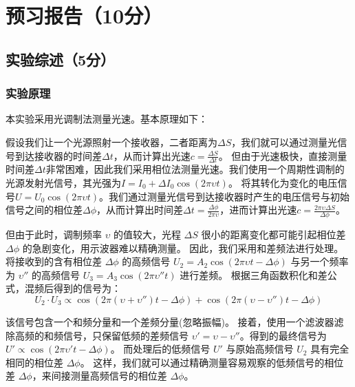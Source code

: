 \documentclass[]{../../templates/Report}%
\begin{document}
\maketitle

\section{预习报告（10分）}
\subsection{实验综述（5分）}
\subsubsection{实验原理}
本实验采用光调制法测量光速。基本原理如下：

假设我们让一个光源照射一个接收器，二者距离为$\Delta S$，我们就可以通过测量光信号到达接收器的时间差$\Delta t$，从而计算出光速$c=\frac{\Delta S}{\Delta t}$。
但由于光速极快，直接测量时间差$\Delta t$非常困难，因此我们采用相位法测量光速。我们使用一个周期性调制的光源发射光信号，其光强为$I=I_0 +\Delta I_0 \cos(2\pi \upsilon t)$。
将其转化为变化的电压信号$U=U_0 \cos(2\pi \upsilon t)$。我们通过测量光信号到达接收器时产生的电压信号与初始信号之间的相位差$\Delta \phi$，从而计算出时间差$\Delta t=\frac{\Delta \phi}{2\pi \upsilon }$，进而计算出光速$c=\frac{2\pi \upsilon  \Delta S}{\Delta \phi}$。

但由于此时，调制频率 $\upsilon $ 的值较大，光程 $\Delta S$ 很小的距离变化都可能引起相位差 $\Delta \phi$ 的急剧变化，用示波器难以精确测量。
因此，我们采用和差频法进行处理。将接收到的含有相位差 $\Delta \phi$ 的高频信号 $U_2 = A_2 \cos(2\pi \upsilon t - \Delta\phi)$ 与另一个频率为 $\upsilon ''$ 的高频信号 $U_3 = A_3 \cos(2\pi \upsilon ''t)$ 进行差频。
根据三角函数积化和差公式，混频后得到的信号为：
\begin{equation}
U_2 \cdot U_3 \propto \cos(2\pi(\upsilon +\upsilon '')t - \Delta\phi) + \cos(2\pi(\upsilon -\upsilon '')t - \Delta\phi)
\end{equation}

该信号包含一个和频分量和一个差频分量(忽略振幅)。
接着，使用一个滤波器滤除高频的和频信号，只保留低频的差频信号 $\upsilon ' = \upsilon  - \upsilon ''$。得到的最终信号为 $U' \propto \cos(2\pi \upsilon 't - \Delta\phi)$。
而处理后的低频信号 $U'$ 与原始高频信号 $U_2$ 具有完全相同的相位差 $\Delta\phi$。
这样，我们就可以通过精确测量容易观察的低频信号的相位差 $\Delta\phi$，来间接测量高频信号的相位差 $\Delta\phi$。
\end{document}
